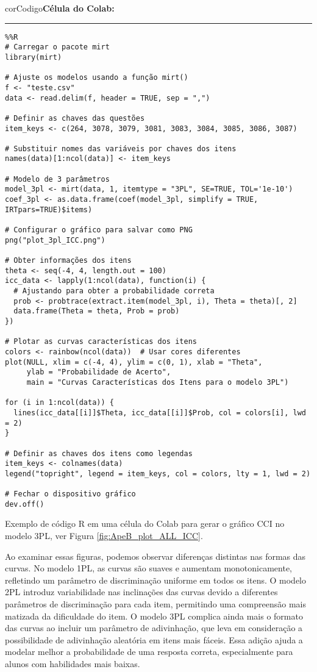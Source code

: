 \begin{listing}[!ht]
    \begin{myboxCode}{corCodigo}{\textbf{Célula do Colab: }}\vspace{3mm}
    \hrule
    \begin{verbatim}
%%R
# Carregar o pacote mirt
library(mirt)

# Ajuste os modelos usando a função mirt()
f <- "teste.csv"
data <- read.delim(f, header = TRUE, sep = ",")

# Definir as chaves das questões
item_keys <- c(264, 3078, 3079, 3081, 3083, 3084, 3085, 3086, 3087)

# Substituir nomes das variáveis por chaves dos itens
names(data)[1:ncol(data)] <- item_keys

# Modelo de 3 parâmetros
model_3pl <- mirt(data, 1, itemtype = "3PL", SE=TRUE, TOL='1e-10')
coef_3pl <- as.data.frame(coef(model_3pl, simplify = TRUE, IRTpars=TRUE)$items)

# Configurar o gráfico para salvar como PNG
png("plot_3pl_ICC.png")

# Obter informações dos itens
theta <- seq(-4, 4, length.out = 100)
icc_data <- lapply(1:ncol(data), function(i) {
  # Ajustando para obter a probabilidade correta
  prob <- probtrace(extract.item(model_3pl, i), Theta = theta)[, 2]  
  data.frame(Theta = theta, Prob = prob)
})

# Plotar as curvas características dos itens
colors <- rainbow(ncol(data))  # Usar cores diferentes
plot(NULL, xlim = c(-4, 4), ylim = c(0, 1), xlab = "Theta", 
     ylab = "Probabilidade de Acerto", 
     main = "Curvas Características dos Itens para o modelo 3PL")

for (i in 1:ncol(data)) {
  lines(icc_data[[i]]$Theta, icc_data[[i]]$Prob, col = colors[i], lwd = 2)
}

# Definir as chaves dos itens como legendas
item_keys <- colnames(data)
legend("topright", legend = item_keys, col = colors, lty = 1, lwd = 2)

# Fechar o dispositivo gráfico
dev.off()
\end{verbatim}
\end{myboxCode}
\caption{Exemplo de código R em uma célula do Colab para gerar o gráfico CCI no modelo 3PL, ver Figura \ref{fig:ApeB_plot_ALL_ICC}.}
\label{lst:ApeB_plot_3pl}
\end{listing}

Ao examinar essas figuras, podemos observar diferenças distintas nas formas das curvas. No modelo 1PL, as curvas são suaves e aumentam monotonicamente, refletindo um parâmetro de discriminação uniforme em todos os itens. O modelo 2PL introduz variabilidade nas inclinações das curvas devido a diferentes parâmetros de discriminação para cada item, permitindo uma compreensão mais matizada da dificuldade do item. O modelo 3PL complica ainda mais o formato das curvas ao incluir um parâmetro de adivinhação, que leva em consideração a possibilidade de adivinhação aleatória em itens mais fáceis. Essa adição ajuda a modelar melhor a probabilidade de uma resposta correta, especialmente para alunos com habilidades mais baixas.

